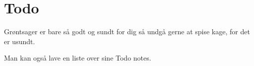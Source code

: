 \section{Todo}
Grøntsager er bare så godt og sundt for dig  så undgå gerne at spise kage, for det er usundt.

Man kan også lave en liste over sine Todo notes.
\listoftodos